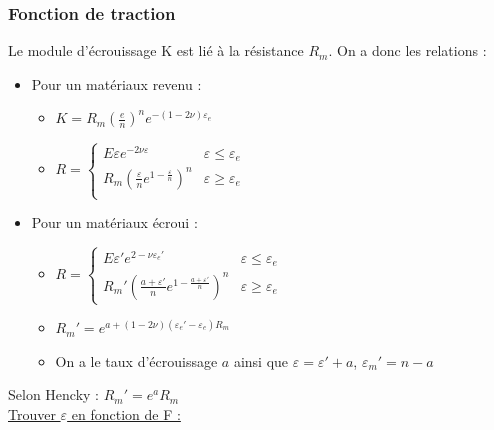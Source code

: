 \documentclass[../main.tex]{subfiles}
\begin{document}
\subsubsection{Fonction de traction}
Le module d'écrouissage K est lié à la résistance $R_m$. On a donc les relations :\\
\begin{itemize}
    \item Pour un matériaux revenu : \begin{itemize}
        \item $K = R_m (\frac{e}{n})^n e^{-(1-2\nu)\varepsilon_e}$\\
        \item $R = \begin{cases} E\varepsilon e^{-2\nu \varepsilon} & \varepsilon \leq \varepsilon_e\\ R_m(\frac{\varepsilon}{n}e^{1-\frac{\varepsilon}{n}})^n & \varepsilon \geq \varepsilon_e\\
        \end{cases}$
    \end{itemize}
    \item Pour un matériaux écroui : \begin{itemize}
        \item $R = \begin{cases}E\varepsilon' e^{2-\nu \varepsilon_e'} & \varepsilon\leq \varepsilon_e\\ R_m'(\frac{a+\varepsilon'}{n} e^{1-\frac{a+\varepsilon'}{n}})^n & \varepsilon \geq \varepsilon_e            
        \end{cases}$
        \item $R_m' = e^{a+(1-2\nu)(\varepsilon_e'-\varepsilon_e)R_m}$\\
        \item On a le taux d'écrouissage $a$ ainsi que $\varepsilon=\varepsilon'+a$, $\varepsilon_m' = n-a$\\
    \end{itemize}
\end{itemize}
Selon Hencky : $R_m' = e^a R_m$\\

\quad \underline{Trouver $\varepsilon$ en fonction de F :}\\
\end{document}
